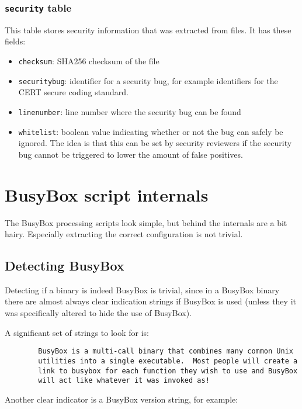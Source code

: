\documentclass[10pt]{article}
\begin{document}
\subsubsection{\texttt{security} table}

This table stores security information that was extracted from files. It has
these fields:

\begin{itemize}
\item \texttt{checksum}: SHA256 checksum of the file
\item \texttt{securitybug}: identifier for a security bug, for example
identifiers for the CERT secure coding standard.
\item \texttt{linenumber}: line number where the security bug can be found
\item \texttt{whitelist}: boolean value indicating whether or not the bug can
safely be ignored. The idea is that this can be set by security reviewers if
the security bug cannot be triggered to lower the amount of false positives.
\end{itemize}

\section{BusyBox script internals}

The BusyBox processing scripts look simple, but behind the internals are a bit
hairy. Especially extracting the correct configuration is not trivial.

\subsection{Detecting BusyBox}

Detecting if a binary is indeed BusyBox is trivial, since in a BusyBox binary
there are almost always clear indication strings if BusyBox is used (unless
they it was specifically altered to hide the use of BusyBox).

A significant set of strings to look for is:

\begin{verbatim}
        BusyBox is a multi-call binary that combines many common Unix
        utilities into a single executable.  Most people will create a
        link to busybox for each function they wish to use and BusyBox
        will act like whatever it was invoked as!
\end{verbatim}

Another clear indicator is a BusyBox version string, for example:
\end{document}
